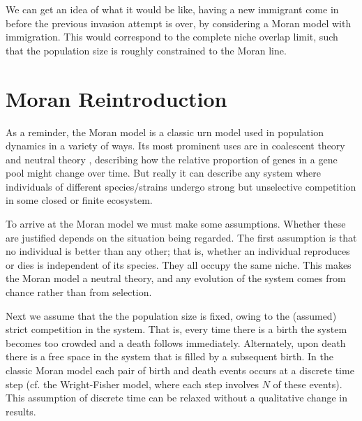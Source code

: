 We can get an idea of what it would be like, having a new immigrant come in before the previous invasion attempt is over, by considering a Moran model with immigration.
This would correspond to the complete niche overlap limit, such that the population size is roughly constrained to the Moran line. %


\section{Moran Reintroduction}
As a reminder, the Moran model \cite{Moran1962} is a classic urn model used in population dynamics in a variety of ways.
Its most prominent uses are in coalescent theory \cite{Blythe2007} and neutral theory \cite{Hubbell2001}, describing how the relative proportion of genes in a gene pool might change over time. 
But really it can describe any system where individuals of different species/strains undergo strong but unselective competition in some closed or finite ecosystem.

To arrive at the Moran model we must make some assumptions.
Whether these are justified depends on the situation being regarded.
The first assumption is that no individual is better than any other; that is, whether an individual reproduces or dies is independent of its species. %
They all occupy the same niche. 
This makes the Moran model a neutral theory, and any evolution of the system comes from chance rather than from selection. 

Next we assume that the the population size is fixed, owing to the (assumed) strict competition in the system.
That is, every time there is a birth the system becomes too crowded and a death follows immediately. Alternately, upon death there is a free space in the system that is filled by a subsequent birth.
In the classic Moran model each pair of birth and death events occurs at a discrete time step (cf. the Wright-Fisher model, where each step involves $N$ of these events). %
This assumption of discrete time can be relaxed without a qualitative change in results. 


